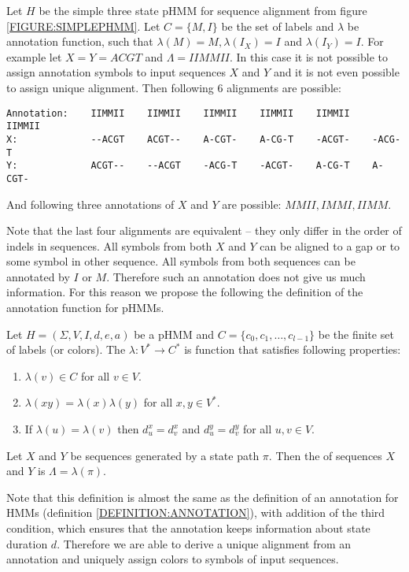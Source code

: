 Let $H$ be the simple  three state pHMM for sequence alignment from figure
\ref{FIGURE:SIMPLEPHMM}. Let $C=\{M,I\}$ be the set of labels and $\lambda$ be
annotation function, such that $\lambda(M)=M, \lambda(I_X)=I$ and
$\lambda(I_Y)=I$.   For example let $X=Y=ACGT$ and $\Lambda = IIMMII$.  In this
case it is not possible to assign annotation symbols to input sequences $X$ and
$Y$ and it is not even possible to assign unique alignment.  Then following $6$
alignments are possible:
\begin{verbatim}
Annotation:    IIMMII    IIMMII    IIMMII    IIMMII    IIMMII    IIMMII
X:             --ACGT    ACGT--    A-CGT-    A-CG-T    -ACGT-    -ACG-T
Y:             ACGT--    --ACGT    -ACG-T    -ACGT-    A-CG-T    A-CGT-
\end{verbatim}
And following three annotations of $X$ and $Y$ are possible: $MMII,IMMI,IIMM$.

Note that the last four  alignments are equivalent -- they only differ in the order
of indels in sequences. All symbols from both $X$ and $Y$ can be aligned to a gap
or to some symbol in other sequence. All symbols from both sequences can be
annotated by $I$ or $M$. Therefore such an annotation does not give us much
information.
For this reason we propose the following the definition of the annotation
function for  pHMMs.

\begin{definition}
Let $H=(\Sigma,V,I,d,e,a)$ be a pHMM and $C=\{c_0,c_1,\dots,c_{l-1}\}$ be the
finite set of labels (or colors). The 
$\lambda:V^*\to C^*$ is function that satisfies following properties: 
\begin{enumerate}
\item $\lambda(v)\in C$ for all $v\in V$.
\item $\lambda(xy) = \lambda(x)\lambda(y)$ for all $x,y\in V^*$.
\item If $\lambda(u)=\lambda(v)$ then $d^x_u=d^x_v$ and $d^y_u=d^y_v$ for all
$u,v\in V$.
\end{enumerate}
Let $X$ and $Y$ be sequences generated by a state path $\pi$. Then the
 of sequences $X$ and $Y$ is 
$\Lambda=\lambda(\pi)$.
\end{definition}

Note that this definition is almost the same as the definition of an annotation
for HMMs (definition \ref{DEFINITION:ANNOTATION}),  
with addition of the  third condition, which ensures that
the annotation keeps information about state duration $d$. Therefore we are able to
derive a unique alignment from an annotation and uniquely assign colors to symbols of
input sequences.

